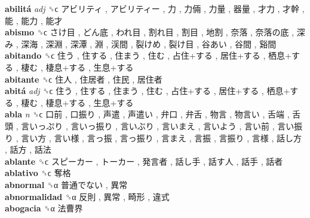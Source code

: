 \textbf{abilitá} \emph{adj}  ␝ϲ   アビリティ ,  アビリティー ,  力 ,  力倆 ,  力量 ,  器量 ,  才力 ,  才幹 ,  能 ,  能力 ,  能才   \\
\textbf{abismo} ␝ϲ   さけ目 ,  どん底 ,  われ目 ,  割れ目 ,  割目 ,  地割 ,  奈落 ,  奈落の底 ,  深み ,  深海 ,  深淵 ,  深潭 ,  淵 ,  渓間 ,  裂けめ ,  裂け目 ,  谷あい ,  谷間 ,  谿間   \\
\textbf{abitando} ␝ϲ   住う ,  住する ,  住まう ,  住む ,  占住+する ,  居住+する ,  栖息+する ,  棲む ,  棲息+する ,  生息+する   \\
\textbf{abitante} ␝ϲ   住人 ,  住居者 ,  住民 ,  居住者   \\
\textbf{abitá} \emph{adj}  ␝ϲ   住う ,  住する ,  住まう ,  住む ,  占住+する ,  居住+する ,  栖息+する ,  棲む ,  棲息+する ,  生息+する   \\
\textbf{abla} \emph{n}  ␝ϲ   口前 ,  口振り ,  声遣 ,  声遣い ,  弁口 ,  弁舌 ,  物言 ,  物言い ,  舌端 ,  舌頭 ,  言いっぷり ,  言いっ振り ,  言いぶり ,  言いまえ ,  言いよう ,  言い前 ,  言い振り ,  言い方 ,  言い様 ,  言っ振 ,  言っ振り ,  言まえ ,  言振 ,  言振り ,  言様 ,  話し方 ,  話方 ,  話法   \\
\textbf{ablante} ␝ϲ   スピーカー ,  トーカー ,  発言者 ,  話し手 ,  話す人 ,  話手 ,  話者   \\
\textbf{ablativo} ␝ϲ   奪格   \\
\textbf{abnormal} ␝α   普通でない ,  異常   \\
\textbf{abnormalidad} ␝α   反則 ,  異常 ,  畸形 ,  違式   \\
\textbf{abogacia} ␝α   法曹界   \\
